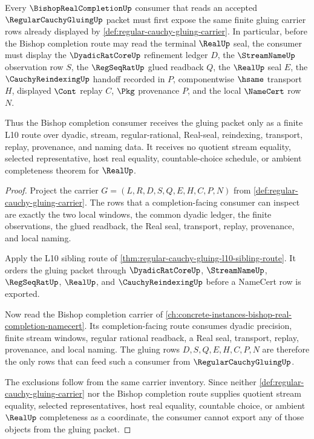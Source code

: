 \begin{theorem}
\label{thm:regular-cauchy-gluing-bishop-completion-consumer}
Every $\BishopRealCompletionUp$ consumer that reads an accepted $\RegularCauchyGluingUp$ packet must first expose the same finite gluing carrier rows already displayed by \autoref{def:regular-cauchy-gluing-carrier}. In particular, before the Bishop completion route may read the terminal $\RealUp$ seal, the consumer must display the $\DyadicRatCoreUp$ refinement ledger $D$, the $\StreamNameUp$ observation row $S$, the $\RegSeqRatUp$ glued readback $Q$, the $\RealUp$ seal $E$, the $\CauchyReindexingUp$ handoff recorded in $P$, componentwise $\hsame$ transport $H$, displayed $\Cont$ replay $C$, $\Pkg$ provenance $P$, and the local $\NameCert$ row $N$.

Thus the Bishop completion consumer receives the gluing packet only as a finite L10 route over dyadic, stream, regular-rational, Real-seal, reindexing, transport, replay, provenance, and naming data. It receives no quotient stream equality, selected representative, host real equality, countable-choice schedule, or ambient completeness theorem for $\RealUp$.
\end{theorem}
\begin{proof}
Project the carrier $G=(L,R,D,S,Q,E,H,C,P,N)$ from \autoref{def:regular-cauchy-gluing-carrier}. The rows that a completion-facing consumer can inspect are exactly the two local windows, the common dyadic ledger, the finite observations, the glued readback, the Real seal, transport, replay, provenance, and local naming.

Apply the L10 sibling route of \autoref{thm:regular-cauchy-gluing-l10-sibling-route}. It orders the gluing packet through $\DyadicRatCoreUp$, $\StreamNameUp$, $\RegSeqRatUp$, $\RealUp$, and $\CauchyReindexingUp$ before a NameCert row is exported.

Now read the Bishop completion carrier of \autoref{ch:concrete-instances-bishop-real-completion-namecert}. Its completion-facing route consumes dyadic precision, finite stream windows, regular rational readback, a Real seal, transport, replay, provenance, and local naming. The gluing rows $D,S,Q,E,H,C,P,N$ are therefore the only rows that can feed such a consumer from $\RegularCauchyGluingUp$.

The exclusions follow from the same carrier inventory. Since neither \autoref{def:regular-cauchy-gluing-carrier} nor the Bishop completion route supplies quotient stream equality, selected representatives, host real equality, countable choice, or ambient $\RealUp$ completeness as a coordinate, the consumer cannot export any of those objects from the gluing packet.
\end{proof}
